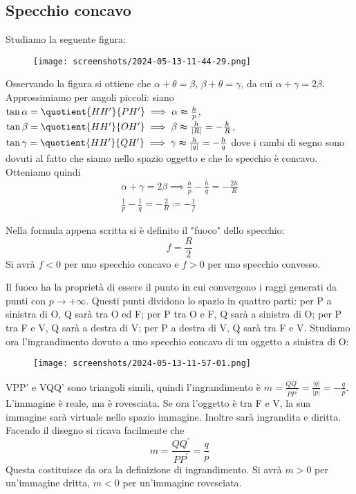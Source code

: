 \subsection{Specchio concavo}
Studiamo la seguente figura:
\begin{figure}[H]
	\centering
	\texttt{[image: screenshots/2024-05-13-11-44-29.png]}
\end{figure}
Osservando la figura si ottiene che \(\alpha + \theta = \beta \), \(\beta + \theta = \gamma \), da cui \(\alpha + \gamma = 2 \beta \). Approssimiamo per angoli piccoli: siano \(\tan \alpha = \quotient{HH^{\prime} }{PH^{\prime} } \implies \alpha \thickapprox \frac{h}{p} \), \(\tan \beta = \quotient{HH^{\prime} }{OH^{\prime} } \implies \beta \thickapprox \frac{h}{\vert R \vert }= -\frac{h}{R} \), \(\tan \gamma = \quotient{HH^{\prime} }{QH^{\prime} }\implies \gamma \thickapprox \frac{h}{\vert q \vert }=-\frac{h}{q} \) dove i cambi di segno sono dovuti al fatto che siamo nello spazio oggetto e che lo specchio è concavo. Otteniamo quindi
\begin{gather}
	\alpha + \gamma = 2\beta \implies \frac{h}{p} - \frac{h}{q} = -\frac{2h}{R}\\
	\frac{1}{p} - \frac{1}{q}= - \frac{2}{R} \coloneqq -\frac{1}{f}
\end{gather}
\begin{definition}
	Nella formula appena scritta si è definito il "fuoco" dello specchio:
	\begin{equation}
		f=\frac{R}{2}
	\end{equation}
	Si avrà \(f<0\) per uno specchio concavo e \(f>0 \) per uno specchio convesso.
\end{definition}
Il fuoco ha la proprietà di essere il punto in cui convergono i raggi generati da punti con \(p\to +\infty \). Questi punti dividono lo spazio in quattro parti: per P a sinistra di O, Q sarà tra O ed F; per P tra O e F, Q sarà a sinistra di O; per P tra F e V, Q sarà a destra di V; per P a destra di V, Q sarà tra F e V. Studiamo ora l'ingrandimento dovuto a uno specchio concavo di un oggetto a sinistra di O:
\begin{figure}[H]
	\centering
	\texttt{[image: screenshots/2024-05-13-11-57-01.png]}
\end{figure}
VPP' e VQQ' sono triangoli simili, quindi l'ingrandimento è \(m= \frac{QQ^{\prime} }{PP^{\prime} }=\frac{\vert q \vert }{\vert p \vert }= -\frac{q}{p}\). L'immagine è reale, ma è rovesciata. Se ora l'oggetto è tra F e V, la sua immagine sarà virtuale nello spazio immagine. Inoltre sarà ingrandita e diritta. Facendo il disegno si ricava facilmente che
\begin{equation}
	m = \frac{QQ^{\prime} }{PP^{\prime} }=\frac{q}{p}
\end{equation}
Questa costituisce da ora la definizione di ingrandimento. Si avrà \(m> 0\) per un'immagine dritta, \(m<0\) per un'immagine rovesciata.

